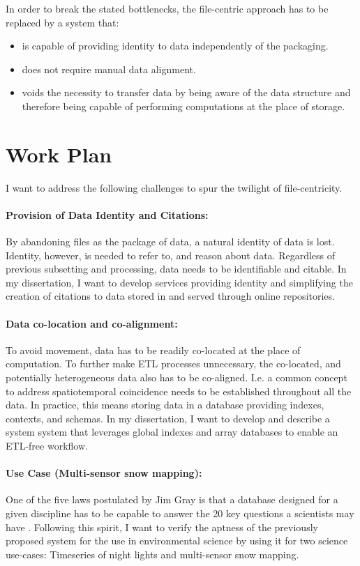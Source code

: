 \documentclass[letterpaper, parskip=half]{scrartcl}
\begin{document}
In order to break the stated bottlenecks, the file-centric approach has to be replaced by a system that:
\begin{itemize}
    \item is capable of providing identity to data independently of the packaging.
    \item does not require manual data alignment.
    \item voids the necessity to transfer data by being aware of the data structure and therefore being capable of performing computations at the place of storage.
\end{itemize}


\newpage

\section{Work Plan}
I want to address the following challenges to spur the twilight of file-centricity.

\paragraph{Provision of Data Identity and Citations:}
By abandoning files as the package of data, a natural identity of data is lost. Identity, however, is needed to refer to, and reason about data. Regardless of previous subsetting and processing, data needs to be identifiable and citable. In my dissertation, I want to develop services providing identity and simplifying the creation of citations to data stored in and served through online repositories.

\paragraph{Data co-location and co-alignment:}
To avoid movement, data has to be readily co-located at the place of computation. To further make \gls{ETL} processes unnecessary, the co-located, and potentially heterogeneous data also has to be co-aligned. I.e. a common concept to address spatiotemporal coincidence needs to be established throughout all the data. In practice, this means storing data in a database providing indexes, contexts, and schemas. 
In my dissertation, I want to develop and describe a system system that leverages global indexes and array databases to enable an \gls{ETL}-free workflow.

\paragraph{Use Case (Multi-sensor snow mapping):}
One of the five laws postulated by Jim Gray is that a database designed for a given discipline has to be capable to answer the 20 key questions a scientists may have \citep{Hey2009, Szalay2009}.
Following this spirit, I want to verify the aptness of the previously proposed system for the use in environmental science by using it for two science use-cases: Timeseries of night lights and multi-sensor snow mapping. 
\end{document}
